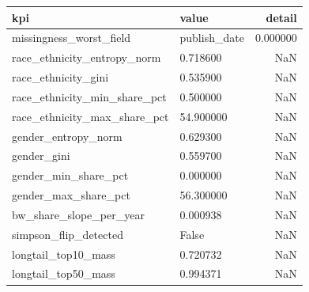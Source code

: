 \begin{tabular}{llr}
\toprule
kpi & value & detail \\
\midrule
missingness_worst_field & publish_date & 0.000000 \\
race_ethnicity_entropy_norm & 0.718600 & NaN \\
race_ethnicity_gini & 0.535900 & NaN \\
race_ethnicity_min_share_pct & 0.500000 & NaN \\
race_ethnicity_max_share_pct & 54.900000 & NaN \\
gender_entropy_norm & 0.629300 & NaN \\
gender_gini & 0.559700 & NaN \\
gender_min_share_pct & 0.000000 & NaN \\
gender_max_share_pct & 56.300000 & NaN \\
bw_share_slope_per_year & 0.000938 & NaN \\
simpson_flip_detected & False & NaN \\
longtail_top10_mass & 0.720732 & NaN \\
longtail_top50_mass & 0.994371 & NaN \\
\bottomrule
\end{tabular}
